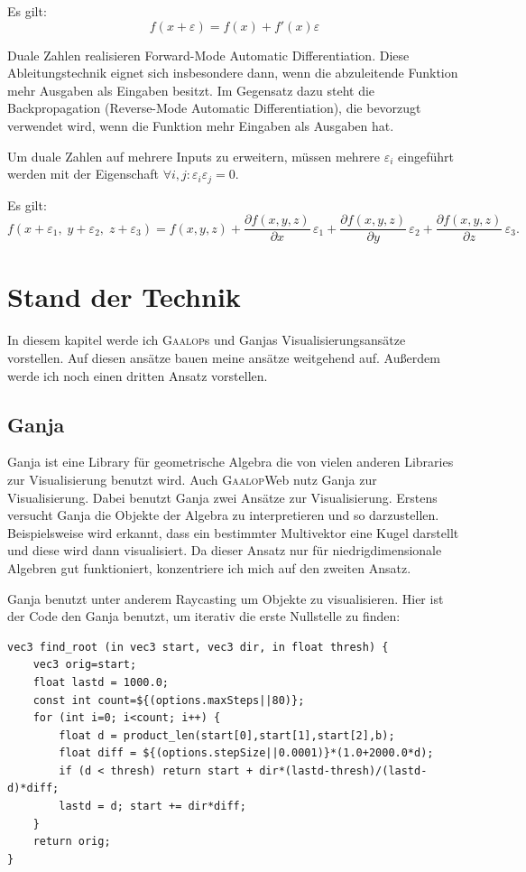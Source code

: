 \documentclass[
	ngerman,%
	accentcolor=9c,%
	ruledheaders=section,%
	class=report,%
	thesis={type=bachelor},%
	fontsize=11pt,%
	parskip=half-,%
	custommargins=true,%
	marginpar=false,%
]{tudapub}
\begin{document}
Es gilt: \[f(x+\varepsilon)=f(x)+f'(x)\varepsilon\]

Duale Zahlen realisieren Forward-Mode Automatic Differentiation.
Diese Ableitungstechnik eignet sich insbesondere dann, wenn die abzuleitende Funktion mehr Ausgaben als Eingaben besitzt.
Im Gegensatz dazu steht die Backpropagation (Reverse-Mode Automatic Differentiation), die bevorzugt verwendet wird, wenn die Funktion mehr Eingaben als Ausgaben hat.

Um duale Zahlen auf mehrere Inputs zu erweitern, müssen mehrere \(\varepsilon_i\) eingeführt werden mit der Eigenschaft \(\forall i,j: \varepsilon_i\varepsilon_j=0\).


Es gilt:
\[
f(x+\varepsilon_1,\; y+\varepsilon_2,\; z+\varepsilon_3)
=
f(x,y,z)
+ \frac{\partial f(x,y,z)}{\partial x}\,\varepsilon_1
+ \frac{\partial f(x,y,z)}{\partial y}\,\varepsilon_2
+ \frac{\partial f(x,y,z)}{\partial z}\,\varepsilon_3.
\]

\chapter{Stand der Technik}
In diesem kapitel werde ich \textsc{Gaalop}s und Ganjas Visualisierungsansätze vorstellen. Auf diesen ansätze bauen meine ansätze weitgehend auf. Außerdem werde ich noch einen dritten Ansatz vorstellen.
\section{Ganja}
Ganja \cite{ganja} ist eine Library für geometrische Algebra die von vielen anderen Libraries zur Visualisierung benutzt wird. Auch \textsc{Gaalop}Web nutz Ganja zur Visualisierung.
Dabei benutzt Ganja zwei Ansätze zur Visualisierung. Erstens versucht Ganja die Objekte der Algebra zu interpretieren und so darzustellen. Beispielsweise wird erkannt, dass ein bestimmter Multivektor eine Kugel darstellt und diese wird dann visualisiert.
Da dieser Ansatz nur für niedrigdimensionale Algebren gut funktioniert, konzentriere ich mich auf den zweiten Ansatz.

Ganja benutzt unter anderem Raycasting um Objekte zu visualisieren.
Hier ist der Code den Ganja benutzt, um iterativ die erste Nullstelle zu finden:
\begin{verbatim}
vec3 find_root (in vec3 start, vec3 dir, in float thresh) {
    vec3 orig=start;
    float lastd = 1000.0;
    const int count=${(options.maxSteps||80)};
    for (int i=0; i<count; i++) {
        float d = product_len(start[0],start[1],start[2],b);
        float diff = ${(options.stepSize||0.0001)}*(1.0+2000.0*d);
        if (d < thresh) return start + dir*(lastd-thresh)/(lastd-d)*diff;
        lastd = d; start += dir*diff;
    }
    return orig;
}
\end{verbatim}
         	
\end{document}
